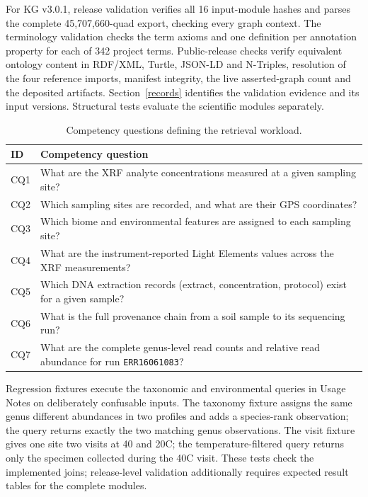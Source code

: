 \begin{revision}
For KG v3.0.1, release validation verifies all 16 input-module hashes and
parses the complete 45,707,660-quad export, checking every graph context.
The terminology validation checks the term axioms and one definition per
annotation property for each of 342 project terms. Public-release checks
verify equivalent ontology content in RDF/XML, Turtle, JSON-LD and
N-Triples, resolution of the four reference imports, manifest integrity,
the live asserted-graph count and the deposited artifacts.
Section~\ref{records} identifies the validation evidence and its input
versions. Structural tests evaluate the scientific modules separately.

\begin{table}[h]
\centering
\caption{Competency questions defining the retrieval workload.}
\label{tab:cq}
\small
\begin{tabular}{p{} p{}}
\toprule
\textbf{ID} & \textbf{Competency question} \\
\midrule
CQ1 & What are the XRF analyte concentrations measured at a given sampling site? \\
CQ2 & Which sampling sites are recorded, and what are their GPS coordinates? \\
CQ3 & Which biome and environmental features are assigned to each sampling site? \\
CQ4 & What are the instrument-reported Light Elements values across the XRF measurements? \\
CQ5 & Which DNA extraction records (extract, concentration, protocol) exist for a given sample? \\
CQ6 & What is the full provenance chain from a soil sample to its sequencing run? \\
CQ7 & What are the complete genus-level read counts and relative read abundance for run \texttt{ERR16061083}? \\
\bottomrule
\end{tabular}
\end{table}

Regression fixtures execute the taxonomic and environmental queries in Usage Notes on deliberately confusable
inputs. The taxonomy fixture assigns the same genus different
abundances in two profiles and adds a species-rank observation; the
query returns exactly the two matching genus observations. The visit
fixture gives one site two visits at 40 and 20\degree C; the
temperature-filtered query returns only the specimen collected during
the 40\degree C visit. These tests check the implemented joins;
release-level validation additionally requires expected result tables
for the complete modules.


\end{revision}
